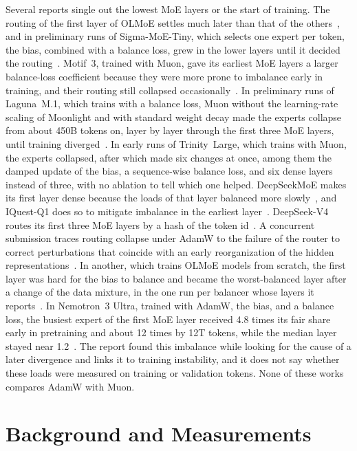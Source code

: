 \documentclass[11pt, a4paper]{article}
\begin{document}
Several reports single out the lowest MoE layers or the start of training. The routing of the first layer of OLMoE settles much later than that of the others~\citep{muennighoff2025olmoe}, and in preliminary runs of Sigma-MoE-Tiny, which selects one expert per token, the bias, combined with a balance loss, grew in the lower layers until it decided the routing~\citep{hu2025sigmamoe}. Motif~3, trained with Muon, gave its earliest MoE layers a larger balance-loss coefficient because they were more prone to imbalance early in training, and their routing still collapsed occasionally~\citep{motif2026motif3}. In preliminary runs of Laguna~M.1, which trains with a balance loss, Muon without the learning-rate scaling of Moonlight and with standard weight decay made the experts collapse from about 450B tokens on, layer by layer through the first three MoE layers, until training diverged~\citep{poolside2026laguna}. In early runs of Trinity~Large, which trains with Muon, the experts collapsed, after which \citet{singh2026trinity} made six changes at once, among them the damped update of the bias, a sequence-wise balance loss, and six dense layers instead of three, with no ablation to tell which one helped. DeepSeekMoE makes its first layer dense because the loads of that layer balanced more slowly~\citep{dai2024deepseekmoe}, and IQuest-Q1 does so to mitigate imbalance in the earliest layer~\citep{yang2026iquest}. DeepSeek-V4 routes its first three MoE layers by a hash of the token id~\citep{deepseek2026v4, roller2021hash}. A concurrent submission traces routing collapse under AdamW to the failure of the router to correct perturbations that coincide with an early reorganization of the hidden representations~\citep{anon2026stuck}. In another, which trains OLMoE models from scratch, the first layer was hard for the bias to balance and became the worst-balanced layer after a change of the data mixture, in the one run per balancer whose layers it reports~\citep{anon2026feedback}. In Nemotron~3 Ultra, trained with AdamW, the bias, and a balance loss, the busiest expert of the first MoE layer received 4.8 times its fair share early in pretraining and about 12 times by 12T tokens, while the median layer stayed near 1.2~\citep{nvidia2026ultra, nvidia2026super}. The report found this imbalance while looking for the cause of a later divergence and links it to training instability, and it does not say whether these loads were measured on training or validation tokens. None of these works compares AdamW with Muon.

\section{Background and Measurements}
\label{sec:background}
\end{document}
